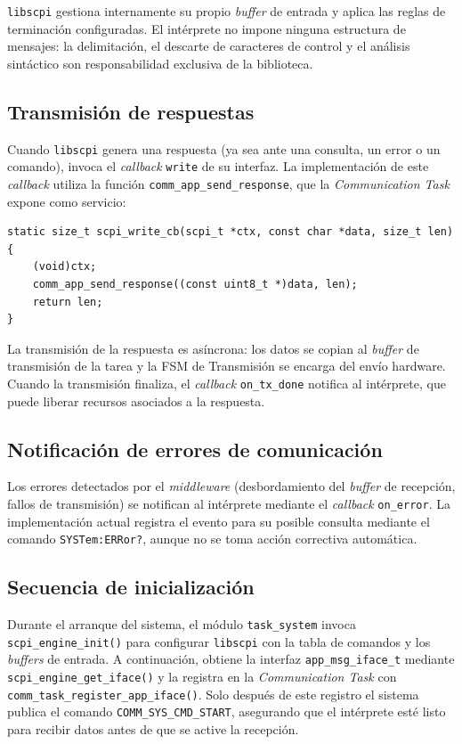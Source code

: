 \texttt{libscpi} gestiona internamente su propio \textit{buffer} de entrada y
aplica las reglas de terminación configuradas. El intérprete no impone ninguna
estructura de mensajes: la delimitación, el descarte de caracteres de control y
el análisis sintáctico son responsabilidad exclusiva de la biblioteca.

\subsection{Transmisión de respuestas}

Cuando \texttt{libscpi} genera una respuesta (ya sea ante una consulta, un error
o un comando), invoca el \textit{callback} \texttt{write} de su interfaz. La
implementación de este \textit{callback} utiliza la función
\texttt{comm\_app\_send\_response}, que la \textit{Communication Task} expone
como servicio:

\begin{verbatim}
static size_t scpi_write_cb(scpi_t *ctx, const char *data, size_t len) {
    (void)ctx;
    comm_app_send_response((const uint8_t *)data, len);
    return len;
}
\end{verbatim}

La transmisión de la respuesta es asíncrona: los datos se copian al
\textit{buffer} de transmisión de la tarea y la FSM de Transmisión se encarga
del envío hardware. Cuando la transmisión finaliza, el \textit{callback}
\texttt{on\_tx\_done} notifica al intérprete, que puede liberar recursos
asociados a la respuesta.

\subsection{Notificación de errores de comunicación}

Los errores detectados por el \textit{middleware} (desbordamiento del
\textit{buffer} de recepción, fallos de transmisión) se notifican al intérprete
mediante el \textit{callback} \texttt{on\_error}. La implementación actual
registra el evento para su posible consulta mediante el comando
\texttt{SYSTem:ERRor?}, aunque no se toma acción correctiva automática.

\subsection{Secuencia de inicialización}

Durante el arranque del sistema, el módulo \texttt{task\_system} invoca
\texttt{scpi\_engine\_init()} para configurar \texttt{libscpi} con la tabla de
comandos y los \textit{buffers} de entrada. A continuación, obtiene la interfaz
\texttt{app\_msg\_iface\_t} mediante \texttt{scpi\_engine\_get\_iface()} y la
registra en la \textit{Communication Task} con
\texttt{comm\_task\_register\_app\_iface()}. Solo después de este registro el
sistema publica el comando \texttt{COMM\_SYS\_CMD\_START}, asegurando que el
intérprete esté listo para recibir datos antes de que se active la recepción.

